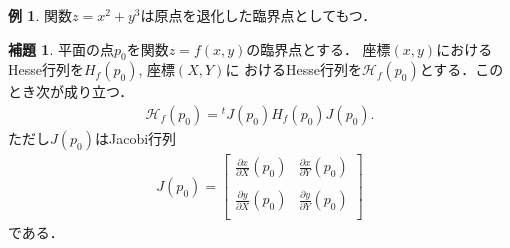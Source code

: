 \documentclass[11pt, a4paper, dvipdfmx]{jsarticle}
\theoremstyle{definition}
\newcommand{\mcal}{\mathcal}
\newcommand{\HH}{\mcal{H}}
\newcommand{\p}{\partial}
\newcommand{\dip}{\displaystyle} %
\theoremstyle{mystyle}
\newtheorem{LMM}[Axiom]{補題}
\newtheorem{EG}[Axiom]{例}
\numberwithin{equation}{section} %
\begin{document}
\begin{EG}
    関数$z=x^2+y^3$は原点を退化した臨界点としてもつ．
\end{EG}

\begin{LMM}
    平面の点$p_0$を関数$z=f(x,y)$の臨界点とする．
    座標$(x,y)$におけるHesse行列を$H_f(p_0)$, 座標$(X,Y)$に
    おけるHesse行列を$\HH_f(p_0)$とする．このとき次が成り立つ．
    \begin{align}
        \HH_f(p_0)={}^t\!J(p_0)H_f(p_0)J(p_0).
    \end{align}
    ただし$J(p_0)$はJacobi行列
    \begin{align}
        J(p_0)=
        \begin{bmatrix*}
            \dip \frac{\p x}{\p X}(p_0)   &\dip\frac{\p x}{\p Y}(p_0)\\\\
            \dip \frac{\p y}{\p X}(p_0) &\dip \frac{\p y}{\p Y}(p_0)\\
        \end{bmatrix*}
        \label{eq:jacbiMet}
    \end{align}
    である．
\end{LMM}
\end{document}
